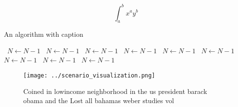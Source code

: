 \documentclass[a4paper]{article}
\begin{document}
\[ \int_{a}^{b}{x^{a}y^{b}} \]

\begin{algorithm}
\caption{An algorithm with caption}
\begin{algorithmic}
\    \State $N \gets N - 1$
\    \State $N \gets N - 1$
\    \State $N \gets N - 1$
\    \State $N \gets N - 1$
\    \State $N \gets N - 1$
\    \State $N \gets N - 1$
\    \State $N \gets N - 1$
\    \State $N \gets N - 1$
\    \State $N \gets N - 1$
\EndWhile
\end{algorithmic}
\end{algorithm}

\begin{figure}
\centering
\texttt{[image: ../scenario\_visualization.png]}
\caption{Coined in lowincome neighborhood in the us president barack obama and the Lost all bahamas weber studies vol 
}
\end{figure}
 
\end{document}
